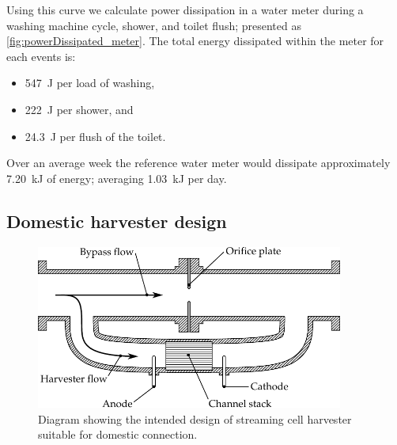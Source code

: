     Using this curve we calculate power dissipation in a water meter during a washing machine cycle, shower, and toilet flush; presented as \cref{fig:powerDissipated_meter}.
    The total energy dissipated within the meter for each events is:
    \begin{itemize}
    \item \SI{547}{\joule} per load of washing,
    \item \SI{222}{\joule} per shower, and
    \item \SI{24.3}{\joule} per flush of the toilet.
    \end{itemize}


    Over an average week the reference water meter would dissipate approximately \SI{7.20}{\kilo\joule} of energy; averaging \SI{1.03}{\kilo\joule} per day.


  \subsection{Domestic harvester design}



    \begin{figure}
      \centering
      \includegraphics[width=0.9\textwidth]{content/pt1/02-WirelessWaterMeter/graphics/harvester}
      \caption{\label{fig:Diagram_harvester}Diagram showing the intended design of streaming cell harvester suitable for domestic connection.}
    \end{figure}